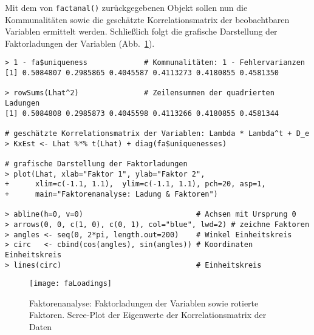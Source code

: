 Mit dem von \lstinline!factanal()! zurückgegebenen Objekt sollen nun die Kommunalitäten sowie die geschätzte Korrelationsmatrix der beobachtbaren Variablen ermittelt werden. Schließlich folgt die grafische Darstellung der Faktorladungen der Variablen (Abb.\ \ref{fig:fa}).
\begin{lstlisting}
> 1 - fa$uniqueness             # Kommunalitäten: 1 - Fehlervarianzen
[1] 0.5084807 0.2985865 0.4045587 0.4113273 0.4180855 0.4581350

> rowSums(Lhat^2)               # Zeilensummen der quadrierten Ladungen
[1] 0.5084808 0.2985873 0.4045598 0.4113266 0.4180855 0.4581344

# geschätzte Korrelationsmatrix der Variablen: Lambda * Lambda^t + D_e
> KxEst <- Lhat %*% t(Lhat) + diag(fa$uniquenesses)

# grafische Darstellung der Faktorladungen
> plot(Lhat, xlab="Faktor 1", ylab="Faktor 2",
+      xlim=c(-1.1, 1.1),  ylim=c(-1.1, 1.1), pch=20, asp=1,
+      main="Faktorenanalyse: Ladung & Faktoren")

> abline(h=0, v=0)                          # Achsen mit Ursprung 0
> arrows(0, 0, c(1, 0), c(0, 1), col="blue", lwd=2) # zeichne Faktoren
> angles <- seq(0, 2*pi, length.out=200)    # Winkel Einheitskreis
> circ   <- cbind(cos(angles), sin(angles)) # Koordinaten Einheitskreis
> lines(circ)                               # Einheitskreis
\end{lstlisting}

\begin{figure}[ht]
\centering
\texttt{[image: faLoadings]}
\vspace*{-1em}
\caption{Faktorenanalyse: Faktorladungen der Variablen sowie rotierte Faktoren. Scree-Plot der Eigenwerte der Korrelationsmatrix der Daten}
\label{fig:fa}
\end{figure}

